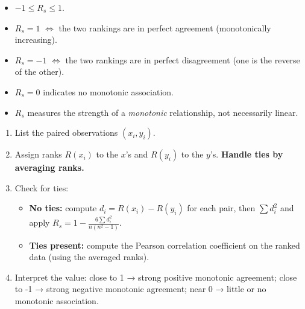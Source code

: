 \documentclass[11pt]{article}
\begin{document}
\begin{propriete}[Properties of \(R_s\)]
\begin{itemize}
\item \(-1 \le R_s \le 1\).
\item \(R_s = 1\) \(\iff\) the two rankings are in perfect agreement (monotonically increasing).
\item \(R_s = -1\) \(\iff\) the two rankings are in perfect disagreement (one is the reverse of the other).
\item \(R_s = 0\) indicates no monotonic association.
\item \(R_s\) measures the strength of a \emph{monotonic} relationship, not necessarily linear.
\end{itemize}
\end{propriete}

\begin{methode}
\begin{enumerate}
\item List the paired observations \((x_i, y_i)\).
\item Assign ranks \(R(x_i)\) to the \(x\)'s and \(R(y_i)\) to the \(y\)'s. \textbf{Handle ties by averaging ranks.}
\item Check for ties:
\begin{itemize}
\item \textbf{No ties:} compute \(d_i = R(x_i)-R(y_i)\) for each pair, then \(\sum d_i^2\) and apply \(R_s = 1 - \frac{6\sum d_i^2}{n(n^2-1)}\).
\item \textbf{Ties present:} compute the Pearson correlation coefficient on the ranked data (using the averaged ranks).
\end{itemize}
\item Interpret the value: close to 1 → strong positive monotonic agreement; close to -1 → strong negative monotonic agreement; near 0 → little or no monotonic association.
\end{enumerate}
\end{methode}
\end{document}

